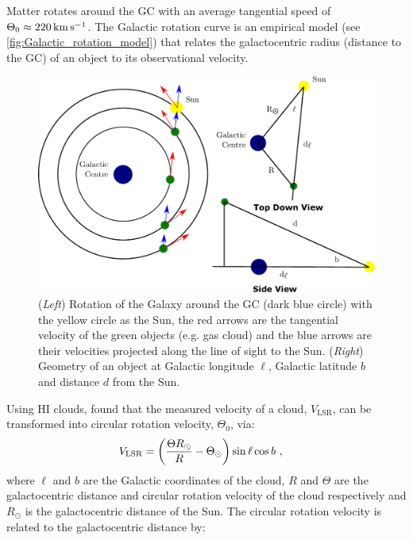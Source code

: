 Matter rotates around the GC with an average tangential speed of $\Theta_0\approx 220\,\si{\kilo\meter\per\second}$. The Galactic rotation curve is an empirical model (see \autoref{fig:Galactic_rotation_model}) that relates the galactocentric radius (distance to the GC) of an object to its observational velocity.
\begin{figure}[h!]
	\centering
	\includegraphics[width=1.0\textwidth]{06_Interstellar_Medium/Images/Theory/galaxy_combined.pdf}
	\caption{(\textit{Left}) Rotation of the Galaxy around the GC (dark blue circle) with the yellow circle as the Sun, the red arrows are the tangential velocity of the green objects (e.g. gas cloud) and the blue arrows are their velocities projected along the line of sight to the Sun. (\textit{Right}) Geometry of an object at Galactic longitude $\ell$, Galactic latitude $b$ and distance $d$ from the Sun.}
	\label{fig:Galactic_rotation_model}
\end{figure}
Using HI clouds, \cite{1993A&A...275...67B} found that the measured velocity of a cloud, $V_\text{LSR}$, can be transformed into circular rotation velocity, $\Theta_0$, via:
\begin{equation}
\begin{aligned}
    V_\text{LSR}&=\qty(\frac{\Theta R_\odot}{R}-\Theta_\odot)\sin\ell \cos b\text{ ,}
\end{aligned} \label{eq:chapter_6_brand_blitz_velocity}
\end{equation}
\noindent where $\ell$ and $b$ are the Galactic coordinates of the cloud, $R$ and $\Theta$ are the galactocentric distance and circular rotation velocity of the cloud respectively and $R_\odot$ is the galactocentric distance of the Sun. The circular rotation velocity is related to the galactocentric distance by:

